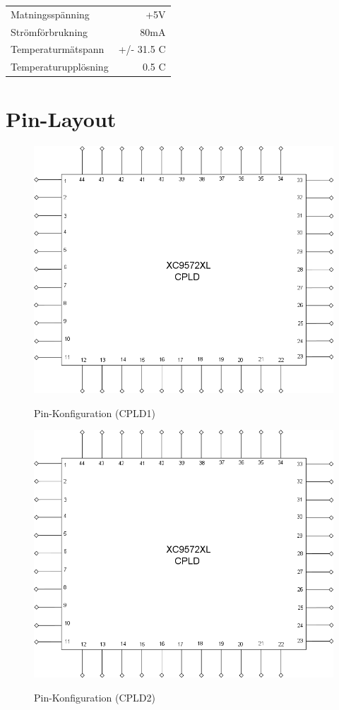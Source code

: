 \documentclass[a4paper,11pt]{article}
\begin{document}
		\begin{tabular}{ l r}
		   	Matningsspänning & +5V\\
		   	Strömförbrukning & ~80mA\\
		   	Temperaturmätspann & +/- 31.5 C\\
			Temperaturupplösning & 0.5 C\\	
		\end{tabular}

	\section{Pin-Layout}

		\begin{figure}[ht!]
		  \centering
		      \includegraphics[scale=0.48, angle=0]{PinDiagram.png}
			\label{fig:Pin1}
		  	\caption{Pin-Konfiguration (CPLD1)}
		\end{figure}

		\begin{figure}[ht!]
		  \centering
		      \includegraphics[scale=0.48, angle=0]{PinDiagram.png}
			\label{fig:Pin1}
		  	\caption{Pin-Konfiguration (CPLD2)}
		\end{figure}
\end{document}
